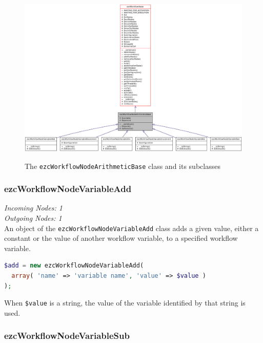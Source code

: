 \begin{figure}[hbt]
\begin{center}
\includegraphics[width=16cm]{figures/WorkflowNodeArithmeticBase}\\[5mm]
\end{center}
\caption{The \texttt{ezcWorkflowNodeArithmeticBase} class and its subclasses}
\label{classezcWorkflowNodeArithmeticBase}
\end{figure}

\subsubsection{ezcWorkflowNodeVariableAdd}

\emph{Incoming Nodes: 1}\\
\emph{Outgoing Nodes: 1}\\

An object of the \texttt{ezcWorkflowNodeVariableAdd} class adds a given value,
either a constant or the value of another workflow variable, to a specified
workflow variable.

\begin{lstlisting}[language=PHP]
$add = new ezcWorkflowNodeVariableAdd(
  array( 'name' => 'variable name', 'value' => $value )
);
\end{lstlisting}

When \texttt{\$value} is a string, the value of the variable identified by
that string is used.

\subsubsection{ezcWorkflowNodeVariableSub}


